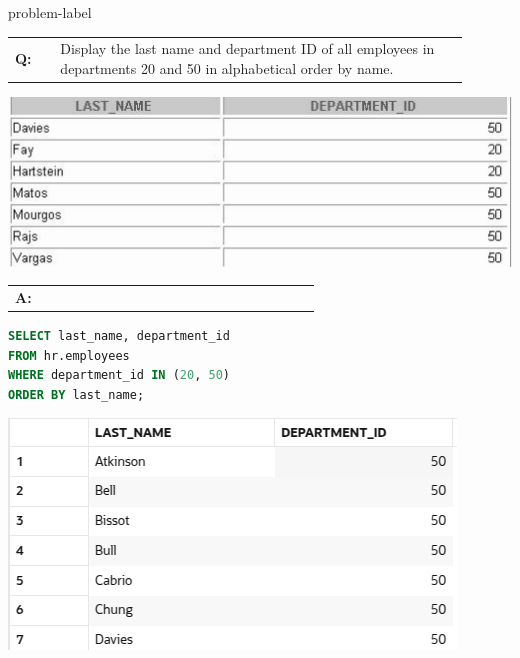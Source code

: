 \begin{problem}{}{problem-label}

\begin{tabular}{@{}l p{0.9\linewidth}@{}}
  \textbf{Q:} & Display the last name and department ID of all employees in departments 20 and 50 in alphabetical order by name.
\end{tabular}

\begin{center}
  \includegraphics[scale=0.8]{images/c2q5.png}
\end{center}

\begin{tabular}{@{}l p{0.9\linewidth}@{}}
  \textbf{A:} & 
\end{tabular}

\begin{lstlisting}[language=SQL]
SELECT last_name, department_id
FROM hr.employees
WHERE department_id IN (20, 50)
ORDER BY last_name;
\end{lstlisting}

\vspace{1em}

\begin{center}
  \includegraphics[scale=0.8]{images/c2a5.png}
\end{center}

\end{problem}


